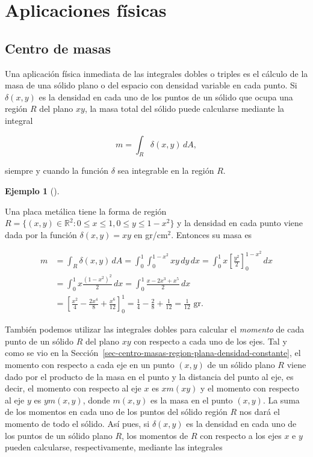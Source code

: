 \documentclass[
  a4paper,
]{scrreport}
\theoremstyle{definition}
\theoremstyle{definition}
\newtheorem{example}{Ejemplo}[chapter]
\theoremstyle{definition}
\theoremstyle{plain}
\theoremstyle{plain}
\theoremstyle{plain}
\theoremstyle{remark}
\begin{document}
\section{Aplicaciones físicas}\label{aplicaciones-fuxedsicas-1}

\subsection{Centro de masas}\label{centro-de-masas-1}

Una aplicación física inmediata de las integrales dobles o triples es el
cálculo de la masa de una sólido plano o del espacio con densidad
variable en cada punto. Si \(\delta(x,y)\) es la densidad en cada uno de
los puntos de un sólido que ocupa una región \(R\) del plano \(xy\), la
masa total del sólido puede calcularse mediante la integral

\[
m = \int_R \delta(x,y)\,dA,
\]

siempre y cuando la función \(\delta\) sea integrable en la región
\(R\).

\begin{example}[]\protect\hypertarget{exm-masa-region-plana}{}\label{exm-masa-region-plana}

Una placa metálica tiene la forma de región
\(R=\{(x,y)\in\mathbb{R}^2: 0\leq x\leq 1, 0\leq y\leq 1-x^2\}\) y la
densidad en cada punto viene dada por la función \(\delta(x,y)=xy\) en
gr/cm\(^2\). Entonces su masa es

\begin{align*}
m 
&= \int_R \delta(x,y)\,dA
= \int_0^1 \int_0^{1-x^2} xy\,dy\,dx
= \int_0^1 x\left[\frac{y^2}{2}\right]_0^{1-x^2}\,dx \\
&= \int_0^1 x\frac{(1-x^2)^2}{2}\,dx 
= \int_0^1 \frac{x-2x^3+x^5}{2}\,dx \\
&= \left[\frac{x^2}{4}-\frac{2x^4}{8}+\frac{x^6}{12}\right]_0^1
= \frac{1}{4}-\frac{2}{8}+\frac{1}{12}
= \frac{1}{12} \mbox{ gr}.
\end{align*}

\end{example}

También podemos utilizar las integrales dobles para calcular el
\emph{momento} de cada punto de un sólido \(R\) del plano \(xy\) con
respecto a cada uno de los ejes. Tal y como se vio en la
Sección~\ref{sec-centro-masas-region-plana-densidad-constante}, el
momento con respecto a cada eje en un punto \((x,y)\) de un sólido plano
\(R\) viene dado por el producto de la masa en el punto y la distancia
del punto al eje, es decir, el momento con respecto al eje \(x\) es
\(xm(xy)\) y el momento con respecto al eje \(y\) es \(ym(x,y)\), donde
\(m(x,y)\) es la masa en el punto \((x,y)\). La suma de los momentos en
cada uno de los puntos del sólido región \(R\) nos dará el momento de
todo el sólido. Así pues, si \(\delta(x,y)\) es la densidad en cada uno
de los puntos de un sólido plano \(R\), los momentos de \(R\) con
respecto a los ejes \(x\) e \(y\) pueden calcularse, respectivamente,
mediante las integrales
\end{document}
